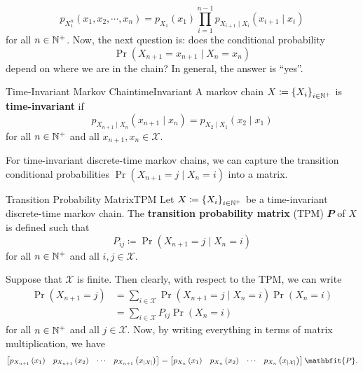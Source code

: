 \documentclass[math]{amznotes}
\theoremstyle{remark}
\begin{document}
\begin{equation*}
    p_{X_1^n}\left(x_1, x_2, \cdots, x_n\right) = p_{X_1}\left(x_1\right)\prod_{i = 1}^{n - 1}p_{X_{i + 1} \mid X_i}\left(x_{i + 1} \mid x_i\right)
\end{equation*}
for all $n \in \mathbb{N}^+$. Now, the next question is: does the conditional probability 
\begin{equation*}
    \Pr\left(X_{n + 1} = x_{n + 1} \mid X_n = x_n\right)
\end{equation*} 
depend on where we are in the chain? In general, the answer is ``yes''.
\begin{dfnbox}{Time-Invariant Markov Chain}{timeInvariant}
    A markov chain $X \coloneqq \left\{X_i\right\}_{i \in \mathbb{N}^+}$ is {\color{red} \textbf{time-invariant}} if 
    \begin{equation*}
        p_{X_{n + 1} \mid X_n}\left(x_{n + 1} \mid x_n\right) = p_{X_2 \mid X_1}\left(x_2 \mid x_1\right)
    \end{equation*}
    for all $n \in \mathbb{N}^+$ and all $x_{n + 1}, x_n \in \mathcal{X}$.
\end{dfnbox}
For time-invariant discrete-time markov chains, we can capture the transition conditional probabilities $\Pr\left(X_{n + 1} = j \mid X_n = i\right)$ into a matrix.
\begin{dfnbox}{Transition Probability Matrix}{TPM}
    Let $X \coloneqq \left\{X_i\right\}_{i \in \mathbb{N}^+}$ be a time-invariant discrete-time markov chain. The {\color{red} \textbf{transition probability matrix}} (TPM) $\mathbfit{P}$ of $X$ is defined such that 
    \begin{equation*}
        P_{ij} \coloneqq \Pr\left(X_{n + 1} = j \mid X_{n} = i\right)
    \end{equation*}
    for all $n \in \mathbb{N}^+$ and all $i, j \in \mathcal{X}$.
\end{dfnbox}
Suppose that $\mathcal{X}$ is finite. Then clearly, with respect to the TPM, we can write 
\begin{align*}
    \Pr\left(X_{n + 1} = j\right) & = \sum_{i \in \mathcal{X}}\Pr\left(X_{n + 1} = j \mid X_n = i\right)\Pr\left(X_n = i\right) \\
    & = \sum_{i \in \mathcal{X}}P_{ij}\Pr\left(X_n = i\right)
\end{align*}
for all $n \in \mathbb{N}^+$ and all $j \in \mathcal{X}$. Now, by writing everything in terms of matrix multiplication, we have 
\begin{equation*}
    \begin{bmatrix}
        p_{X_{n + 1}}\left(x_1\right) & p_{X_{n + 1}}\left(x_2\right) & \cdots & p_{X_{n + 1}}\left(x_{\abs{\mathcal{X}}}\right)
    \end{bmatrix} = \begin{bmatrix}
        p_{X_{n}}\left(x_1\right) & p_{X_{n}}\left(x_2\right) & \cdots & p_{X_{n}}\left(x_{\abs{\mathcal{X}}}\right)
    \end{bmatrix}\mathbfit{P}.
\end{equation*}
\end{document}
